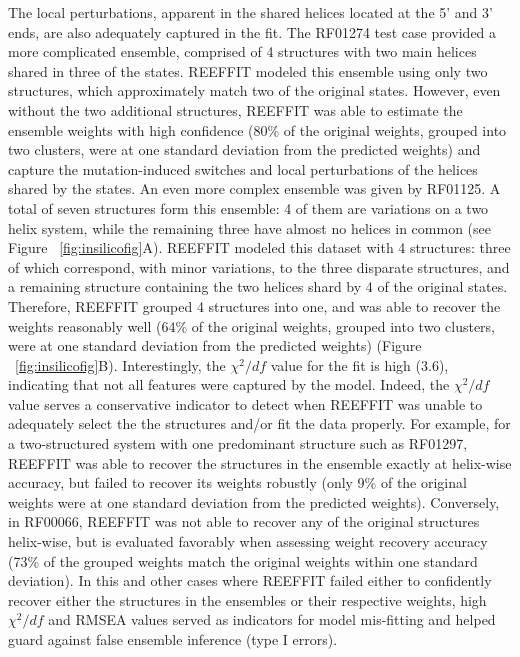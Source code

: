 \documentclass[12pt]{article}
\begin{document}
The local perturbations, apparent in the shared helices located at the 5' and 3' ends, are also adequately captured in the fit.
The RF01274 test case provided a more complicated ensemble, comprised of 4 structures with two main helices shared in three of the states. 
REEFFIT modeled this ensemble using only two structures, which approximately match two of the original states.
However, even without the two additional structures, REEFFIT was able to estimate the ensemble weights with high confidence (80\% of the original weights, grouped into two clusters, were at one standard deviation from the predicted weights) and capture the mutation-induced switches and local perturbations of the helices shared by the states.
An even more complex ensemble was given by RF01125. A total of seven structures form this ensemble: 4 of them are variations on a two helix system, while the remaining three have almost no helices in common (see Figure ~\ref{fig:insilicofig}A). 
REEFFIT modeled this dataset with 4 structures: three of which correspond, with minor variations, to the three disparate structures, and a remaining structure containing the two helices shard by 4 of the original states.
Therefore, REEFFIT grouped 4 structures into one, and was able to recover the weights reasonably well (64\% of the original weights, grouped into two clusters, were at one standard deviation from the predicted weights) (Figure ~\ref{fig:insilicofig}B). 
Interestingly, the $\chi^2/df$ value for the fit is high (3.6), indicating that not all features were captured by the model.
Indeed, the $\chi^2/df$ value serves a conservative indicator to detect when REEFFIT was unable to adequately select the the structures and/or fit the data properly. 
For example, for a two-structured system with one predominant structure such as RF01297, REEFFIT was able to recover the structures in the ensemble exactly at helix-wise accuracy, but failed to recover its weights robustly (only 9\% of the original weights were at one standard deviation from the predicted weights). 
Conversely, in RF00066, REEFFIT was not able to recover any of the original structures helix-wise, but is evaluated favorably when assessing weight recovery accuracy (73\% of the grouped weights match the original weights within one standard deviation).
In this and other cases where REEFFIT failed either to confidently recover either the structures in the ensembles or their respective weights, high $\chi^2/df$ and RMSEA values served as indicators for model mis-fitting and helped guard against false ensemble inference (type I errors).
\end{document}
